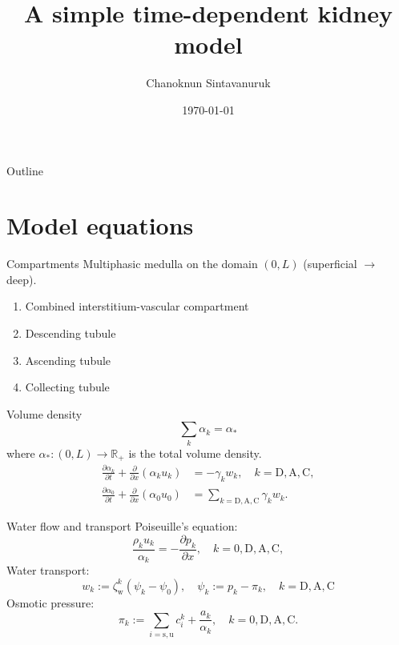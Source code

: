 \documentclass{beamer}
\title[]{A simple time-dependent kidney model}
\author[C. Sint]{Chanoknun Sintavanuruk 
}
\date{\today}
\begin{document}
\begin{frame}
    \titlepage 
\end{frame}

\begin{frame}{Outline}
    \tableofcontents
\end{frame}

\section{Model equations}

\begin{frame}{Compartments}
    Multiphasic medulla on the domain $(0,L)$ (superficial $\to$ deep).
    \begin{enumerate}
        \item Combined interstitium-vascular compartment
        \item Descending tubule
        \item Ascending tubule
        \item Collecting tubule
    \end{enumerate}
\end{frame}

\begin{frame}{Volume density}
    \begin{equation}\label{eq:vol_conserv}
        \sum_k \alpha_k = \alpha_*
    \end{equation}
        where $\alpha_*:(0,L)\to \mathbb{R}_+$ is the total volume density.
    \pause
    \begin{align}\label{eq:volume_dynamics}
        \frac{\partial \alpha_k}{\partial t} + \frac{\partial}{\partial x}\left( \alpha_k u_k \right) &= -\gamma_kw_k,\quad k=\mathrm{D},\mathrm{A},\mathrm{C},\\
        \frac{\partial \alpha_0}{\partial t} + \frac{\partial }{\partial x}\left( \alpha_0 u_0 \right) &= \sum_{k=\mathrm{D},\mathrm{A},\mathrm{C}} \gamma_kw_k.
    \end{align}
\end{frame}

\begin{frame}{Water flow and transport}
    Poiseuille's equation:
    \begin{equation}
        \frac{\rho_k u_k}{\alpha_k} = -\frac{\partial p_k}{\partial x},\quad k=0,\mathrm{D},\mathrm{A},\mathrm{C},
    \end{equation}
    Water transport:
    \begin{equation}
        w_k := \zeta_\mathrm{w}^k\left( \psi_k - \psi_0 \right),\quad \psi_k:=p_k - \pi_k,\quad k=\mathrm{D},\mathrm{A},\mathrm{C}
    \end{equation}
    \pause
    Osmotic pressure:
    \begin{equation}
        \pi_k:= \sum_{i=\mathrm{s},\mathrm{u}}c_i^k+\frac{a_k}{\alpha_k},\quad k=0,\mathrm{D},\mathrm{A},\mathrm{C}.
    \end{equation}
\end{frame}
\end{document}
